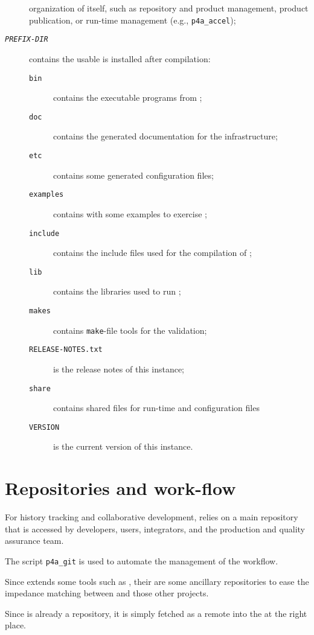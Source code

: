 \documentclass[a4paper]{article}
\begin{document}
\begin{description}
  organization of \Apfa itself, such as repository and product management,
  product publication, or run-time management (e.g., \verb|p4a_accel|);
\item[\texttt{\emph{PREFIX-DIR}}] contains the usable \Apfa is installed
  after compilation:
  \begin{description}
  \item[\texttt{bin}] contains the executable programs from \Apfa;
  \item[\texttt{doc}] contains the generated documentation for the \Apfa
    infrastructure;
  \item[\texttt{etc}] contains some generated configuration files;
  \item[\texttt{examples}] contains with some examples to exercise \Apfa;
  \item[\texttt{include}] contains the include files used for the
    compilation of \Apfa;
  \item[\texttt{lib}] contains the libraries used to run \Apfa;
  \item[\texttt{makes}] contains \texttt{make}-file tools for the
    \Apips validation;
  \item[\texttt{RELEASE-NOTES.txt}] is the release notes of this \Apfa
    instance;
  \item[\texttt{share}] contains shared files for run-time and
    configuration files
  \item[\texttt{VERSION}] is the current version of this \Apfa
    instance.
  \end{description}
\end{description}


\section{Repositories and work-flow}
\label{sec:repos-workfl}

For history tracking and collaborative development, \Apfa relies on a main
\Agit repository that is accessed by \Apfa developers, users, integrators,
and the production and quality assurance team.

The script \verb|p4a_git| is used to automate the management of the
workflow.

Since \Apfa extends some tools such as \Apips, their are some
ancillary repositories to ease the impedance matching between \Apfa and
those other projects.

Since \Apolylib is already a \Agit repository, it is simply fetched as a
remote \Agit into the \Apfa at the right place.
\end{document}

